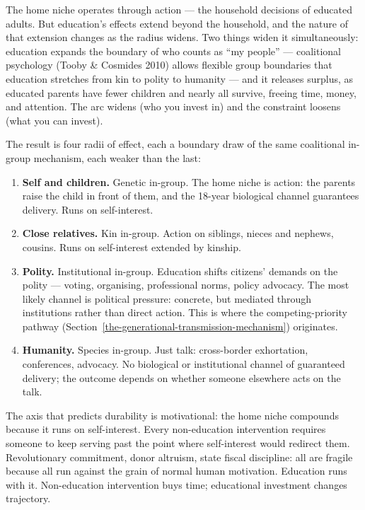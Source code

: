 \documentclass[12pt,letterpaper]{article}
\begin{document}
The home niche operates through action --- the household decisions of
educated adults. But education's effects extend beyond the household,
and the nature of that extension changes as the radius widens. Two
things widen it simultaneously: education expands the boundary of who
counts as ``my people'' --- coalitional psychology (Tooby \& Cosmides
2010) allows flexible group boundaries that education stretches from kin
to polity to humanity --- and it releases surplus, as educated parents have fewer
children and nearly all survive, freeing time, money, and attention.
The arc widens (who you invest in) and the constraint loosens (what you
can invest).

The result is four radii of effect, each a boundary draw of the
same coalitional in-group mechanism, each weaker than the last:

\begin{enumerate}
\item \textbf{Self and children.} Genetic in-group. The home niche
is action: the parents raise the child in front of them, and the
18-year biological channel guarantees delivery. Runs on
self-interest.

\item \textbf{Close relatives.} Kin in-group. Action on siblings,
nieces and nephews, cousins. Runs on self-interest extended by
kinship.

\item \textbf{Polity.} Institutional in-group. Education shifts
citizens' demands on the polity --- voting, organising, professional
norms, policy advocacy. The most likely channel is political
pressure: concrete, but mediated through institutions rather than
direct action. This is where the competing-priority pathway
(Section~\ref{the-generational-transmission-mechanism}) originates.

\item \textbf{Humanity.} Species in-group. Just talk: cross-border
exhortation, conferences, advocacy. No biological or institutional
channel of guaranteed delivery; the outcome depends on whether
someone elsewhere acts on the talk.
\end{enumerate}

The axis that predicts durability is motivational: the home niche
compounds because it runs on self-interest. Every non-education intervention requires
someone to keep serving past the point where self-interest would redirect
them. Revolutionary commitment, donor altruism, state fiscal discipline:
all are fragile because all run against the grain of normal human
motivation. Education runs with it. Non-education intervention buys
time; educational investment changes trajectory.
\end{document}
